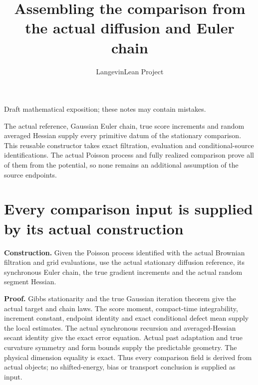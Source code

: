 \documentclass[11pt,a4paper]{article}
\title{\texorpdfstring{Assembling the comparison from the actual diffusion and Euler chain}{Assembling the comparison from the actual diffusion and Euler chain}}
\author{LangevinLean Project}
\date{}
\begin{document}
\maketitle
Draft mathematical exposition; these notes may contain mistakes.


The actual reference, Gaussian Euler chain, true score increments and random averaged Hessian supply every primitive datum of the stationary comparison. This reusable constructor takes exact filtration, evaluation and conditional-source identifications. The actual Poisson process and fully realized comparison prove all of them from the potential, so none remains an additional assumption of the source endpoints.


\section{\texorpdfstring{Every comparison input is supplied by its actual construction}{Every comparison input is supplied by its actual construction}}


\textbf{Construction.} Given the Poisson process identified with the actual Brownian filtration and grid evaluations, use the actual stationary diffusion reference, its synchronous Euler chain, the true gradient increments and the actual random segment Hessian.



\textbf{Proof.} Gibbs stationarity and the true Gaussian iteration theorem give the actual target and chain laws. The score moment, compact-time integrability, increment constant, endpoint identity and exact conditional defect mean supply the local estimates. The actual synchronous recursion and averaged-Hessian secant identity give the exact error equation. Actual past adaptation and true curvature symmetry and form bounds supply the predictable geometry. The physical dimension equality is exact. Thus every comparison field is derived from actual objects; no shifted-energy, bias or transport conclusion is supplied as input.
\end{document}
